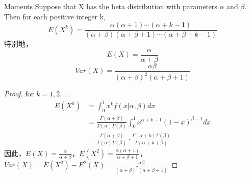 \documentclass[../常见分布.tex]{subfiles}
\begin{document}
\begin{theorem}{Moments}{}
Suppose that X has the beta distribution with parameters $\alpha$ and $\beta$. Then for each positive integer k,
\begin{equation}\label{}
E(X^k)=\frac{\alpha(\alpha+1)\cdots(\alpha+k-1)}{(\alpha+\beta)(\alpha+\beta+1)\cdots(\alpha+\beta+k-1)}
\end{equation}
特别地，
\begin{equation}\label{}
E(X)=\frac{\alpha}{\alpha+\beta}
\end{equation}
\begin{equation}\label{}
Var(X)=\frac{\alpha\beta}{(\alpha+\beta)^2(\alpha+\beta+1)}
\end{equation}
\end{theorem}
\begin{proof}
for $k=1, 2, \dots$
\begin{equation}\label{}
\begin{split}
E(X^k)&=\int_{0}^{1} x^kf(x|\alpha, \beta)dx\\
&=\frac{\Gamma(\alpha+\beta)}{\Gamma(\alpha)\Gamma(\beta)} \int_{0}^{1}x^{\alpha+k-1}(1-x)^{\beta-1}dx\\
&=\frac{\Gamma(\alpha+\beta)}{\Gamma(\alpha)\Gamma(\beta)} \cdot \frac{\Gamma(\alpha+k)\Gamma(\beta)}{\Gamma(\alpha+k+\beta)}
\end{split}
\end{equation}
因此，$E(X)=\frac{\alpha}{\alpha+\beta}$，$E(X^2)=\frac{\alpha(\alpha+1)}{\alpha+\beta+1}$，$Var(X)=E(X^2)-E^2(X)=\frac{\alpha\beta}{(\alpha+\beta)^2(\alpha+\beta+1)}$
\end{proof}
\end{document}
